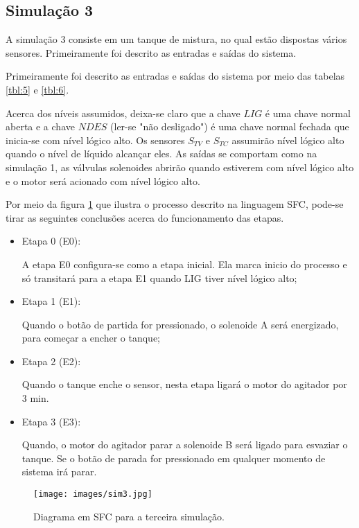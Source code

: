 \subsection{Simulação 3}

A simulação 3 consiste em um tanque de mistura, no qual estão dispostas vários sensores. Primeiramente foi descrito as entradas e saídas do sistema. 

Primeiramente foi descrito as entradas e saídas do sistema por meio das tabelas \ref{tbl:5} e \ref{tbl:6}. 



Acerca dos níveis assumidos, deixa-se claro que a chave $LIG$ é uma chave normal aberta e a chave $NDES$ (ler-se "não desligado") é uma chave normal fechada que inicia-se com nível lógico alto. Os sensores $S_{TV}$ e $S_{TC}$ assumirão nível lógico alto quando o nível de líquido alcançar eles. As saídas se comportam como na simulação 1, as válvulas solenoides abrirão quando estiverem com nível lógico alto e o motor será acionado com nível lógico alto.

Por meio da figura \ref{sim3} que ilustra o processo descrito na linguagem SFC, pode-se tirar as seguintes conclusões acerca do funcionamento das etapas.

\begin{itemize}
    \item Etapa 0 (E0):
    
    A etapa E0 configura-se como a etapa inicial. Ela marca inicio do processo e só transitará para a etapa E1 quando LIG tiver nível lógico alto;
    
    \item Etapa 1 (E1): 
    
    Quando o botão de partida for pressionado, o solenoide A será energizado, para começar a encher o tanque;
    
    \item Etapa 2 (E2): 
    
    Quando o tanque enche o sensor, nesta etapa ligará o motor do agitador por 3 min.
    
    \item Etapa 3 (E3): 
    
    Quando, o motor do agitador parar a solenoide B será ligado para esvaziar o tanque. Se o botão de parada for pressionado em qualquer momento de sistema irá parar. 
\end{itemize}

\begin{figure}[H] 
\centering
\texttt{[image: images/sim3.jpg]}
\caption{Diagrama em SFC para a terceira simulação.}
\label{sim3} 
\end{figure}

